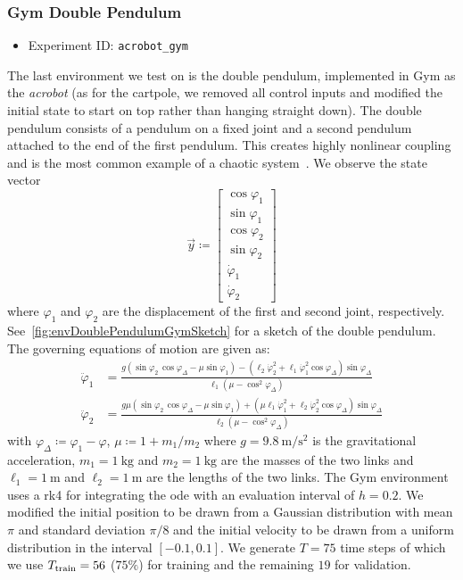 		\subsubsection{Gym Double Pendulum}
			\label{subsubsec:doublePendulum}

			\begin{itemize}
				\item Experiment ID: \texttt{acrobot\_gym}
			\end{itemize}

			The last environment we test on is the double pendulum, implemented in Gym as the \emph{acrobot} (as for the cartpole, we removed all control inputs and modified the initial state to start on top rather than hanging straight down). The double pendulum consists of a pendulum on a fixed joint and a second pendulum attached to the end of the first pendulum. This creates highly nonlinear coupling and is the most common example of a chaotic system~\cite{shinbrotChaosDoublePendulum1992}. We observe the state vector
			\begin{equation*}
				\vec{y} \coloneqq
					\begin{bmatrix}
						\cos\varphi_1 \\
						\sin\varphi_1 \\
						\cos\varphi_2 \\
						\sin\varphi_2 \\
						\dot{\varphi}_1 \\
						\dot{\varphi}_2
					\end{bmatrix}
			\end{equation*}
			where \(\varphi_1\) and \(\varphi_2\) are the displacement of the first and second joint, respectively. See~\autoref{fig:envDoublePendulumGymSketch} for a sketch of the double pendulum. The governing equations of motion are given as:
			\begin{align*}
				\ddot{\varphi}_1 &= \frac{g (\sin\varphi_2 \, \cos\varphi_\Delta - \mu \sin\varphi_1) - (\ell_2 \dot{\varphi}_2^2 + \ell_1 \dot{\varphi}_1^2 \cos\varphi_\Delta) \sin\varphi_\Delta}{\ell_1 (\mu - \cos^2\varphi_\Delta)} \\
				\ddot{\varphi}_2 &= \frac{g \mu (\sin\varphi_2 \, \cos\varphi_\Delta - \mu \sin\varphi_1) + (\mu \ell_1 \dot{\varphi}_1^2 + \ell_2 \dot{\varphi}_2^2 \cos\varphi_\Delta) \sin\varphi_\Delta}{\ell_2 (\mu - \cos^2\varphi_\Delta)}
			\end{align*}
			with \( \varphi_\Delta \coloneqq \varphi_1 - \varphi \), \( \mu \coloneqq 1 + m_1/m_2 \) where \( g = \SI{9.8}{\meter\per\second\squared} \) is the gravitational acceleration, \( m_1 = \SI{1}{\kilogram} \) and \( m_2 = \SI{1}{\kilogram} \) are the masses of the two links and \( \ell_1 = \SI{1}{\meter} \) and \( \ell_2 = \SI{1}{\meter} \) are the lengths of the two links. The Gym environment uses a \ac{rk4} for integrating the \ac{ode} with an evaluation interval of \( h = 0.2 \). We modified the initial position to be drawn from a Gaussian distribution with mean \( \pi \) and standard deviation \( \pi/8 \) and the initial velocity to be drawn from a uniform distribution in the interval \( [-0.1, 0.1] \). We generate \( T = 75 \) time steps of which we use \( T_{\mathrm{train}} = 56 \) (\(75\%\)) for training and the remaining \(19\) for validation.

